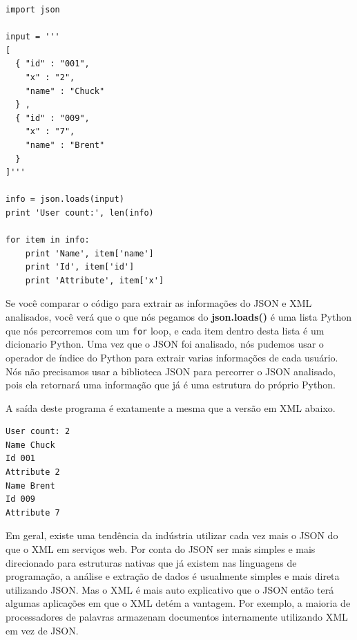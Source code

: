 \beforeverb
\begin{verbatim}
import json

input = '''
[
  { "id" : "001",
    "x" : "2",
    "name" : "Chuck"
  } ,
  { "id" : "009",
    "x" : "7",
    "name" : "Brent"
  } 
]'''

info = json.loads(input)
print 'User count:', len(info)

for item in info:
    print 'Name', item['name']
    print 'Id', item['id']
    print 'Attribute', item['x']
\end{verbatim}
\afterverb
%

Se você comparar o código para extrair as informações do JSON e XML analisados,
você verá que o que nós pegamos do {\bf json.loads()} é uma lista Python
que nós percorremos com um {\tt for} loop, e cada item dentro desta lista
é um dicionario Python. Uma vez que o JSON foi analisado, nós pudemos usar o
operador de índice do Python para extrair varias informações de cada usuário.
Nós não precisamos usar a biblioteca JSON para percorrer o JSON analisado, 
pois ela retornará uma informação que já é uma estrutura do próprio Python.

A saída deste programa é exatamente a mesma que a versão em XML abaixo.

\beforeverb
\begin{verbatim}
User count: 2
Name Chuck
Id 001
Attribute 2
Name Brent
Id 009
Attribute 7
\end{verbatim}
\afterverb

Em geral, existe uma tendência da indústria utilizar cada vez mais o JSON
do que o XML em serviços web. Por conta do JSON ser mais simples e mais
direcionado para estruturas nativas que já existem nas linguagens de
programação, a análise e extração de dados é usualmente simples e mais direta
utilizando JSON. Mas o XML é mais auto explicativo que o JSON então terá
algumas aplicações em que o XML detém a vantagem. Por exemplo, a maioria de 
processadores de palavras armazenam documentos internamente utilizando XML
em vez de JSON.

